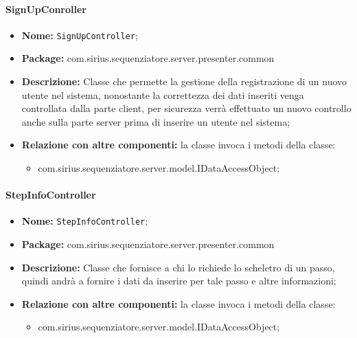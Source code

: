 \paragraph{SignUpConroller}
	\begin{itemize}
		\item \textbf{Nome:} \texttt{SignUpController};
		\item \textbf{Package:} com.sirius.sequenziatore.server.presenter.common
		\item \textbf{Descrizione:} Classe che permette la gestione della registrazione di un nuovo utente nel sistema, nonostante la correttezza dei dati inseriti venga controllata dalla parte client, per sicurezza verrà effettuato un nuovo controllo anche sulla parte server prima di inserire un utente nel sistema;
		\item \textbf{Relazione con altre componenti:} la classe invoca i metodi della classe:
		\begin{itemize}
			\item com.sirius.sequenziatore.server.model.IDataAccessObject;
		\end{itemize}
	\end{itemize}
	
\paragraph{StepInfoController}
	\begin{itemize}
		\item \textbf{Nome:} \texttt{StepInfoController};
		\item \textbf{Package:} com.sirius.sequenziatore.server.presenter.common
		\item \textbf{Descrizione:} Classe che fornisce a chi lo richiede lo scheletro di un passo, quindi andrà a fornire i dati da inserire per tale passo e altre informazioni;
		\item \textbf{Relazione con altre componenti:} la classe invoca i metodi della classe:
		\begin{itemize}
			\item com.sirius.sequenziatore.server.model.IDataAccessObject;
		\end{itemize}
	\end{itemize}
